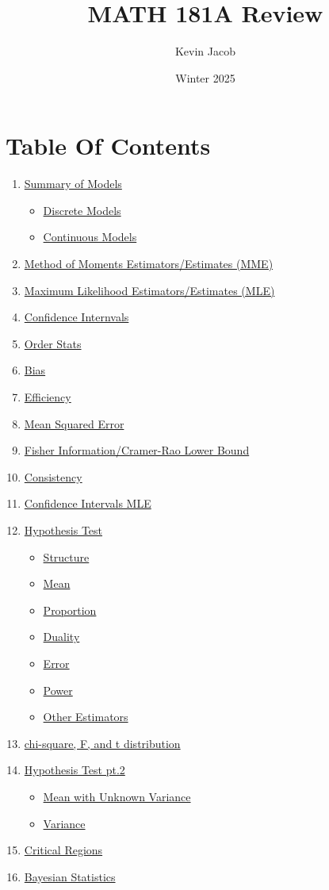 \documentclass{article}
\title{MATH 181A Review}
\author{Kevin Jacob}
\date{Winter 2025}
\begin{document}
\maketitle
\newpage
\section*{Table Of Contents}
\begin{enumerate}
    \item \hyperref[sec:models]{Summary of Models}
    \begin{itemize}
        \item \hyperref[sec:discrete]{Discrete Models}
        \item \hyperref[sec:continuous]{Continuous Models}
    \end{itemize}
    \item \hyperref[sec:MME]{Method of Moments Estimators/Estimates (MME)}
    \item \hyperref[sec:MLE]{Maximum Likelihood Estimators/Estimates (MLE)}
    \item \hyperref[sec:ci]{Confidence Internvals}
    \item \hyperref[sec:order]{Order Stats}
    \item \hyperref[sec:bias]{Bias}
    \item \hyperref[sec:efficiency]{Efficiency}
    \item \hyperref[sec:MSE]{Mean Squared Error}
    \item \hyperref[sec:fish]{Fisher Information/Cramer-Rao Lower Bound}
    \item \hyperref[sec:consistency]{Consistency}
    \item \hyperref[sec:confidence]{Confidence Intervals MLE}
    \item \hyperref[sec:hypothesis]{Hypothesis Test}
    \begin{itemize}
        \item \hyperref[sec:hstructure]{Structure}
        \item \hyperref[sec:hmean]{Mean}
        \item \hyperref[sec:hprop]{Proportion}
        \item \hyperref[sec:hdual]{Duality}
        \item \hyperref[sec:herror]{Error}
        \item \hyperref[sec:hpower]{Power}
        \item \hyperref[sec:hother]{Other Estimators}
    \end{itemize}
    \item \hyperref[sec:cft]{chi-square, F, and t distribution}
    \item \hyperref[sec:hypothesis2]{Hypothesis Test pt.2}
    \begin{itemize}
        \item \hyperref[sec:hmeansunknow]{Mean with Unknown Variance}
        \item \hyperref[sec:hvar]{Variance}
    \end{itemize}
    \item \hyperref[sec:critical]{Critical Regions}
    \item \hyperref[sec:bayes]{Bayesian Statistics}
    

\end{enumerate}
\end{document}
